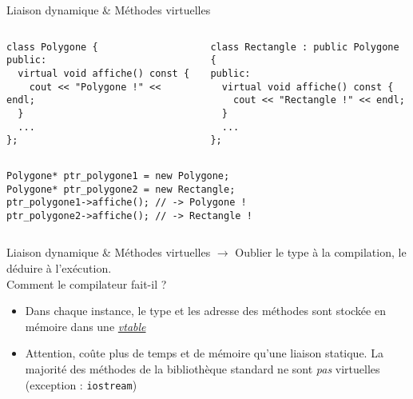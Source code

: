 \documentclass[c]{beamer}
\begin{document}
\begin{frame}[fragile]{Liaison dynamique \& Méthodes virtuelles}
\begin{columns}
\begin{column}{0.5\columnwidth}
\begin{verbatim}
class Polygone {
public:
  virtual void affiche() const {
    cout << "Polygone !" << endl;
  }
  ...
};
\end{verbatim}
\end{column}
\begin{column}{0.5\columnwidth}
\begin{verbatim}
class Rectangle : public Polygone {
public:
  virtual void affiche() const {
    cout << "Rectangle !" << endl;
  }
  ...
};
\end{verbatim}
\end{column}
\end{columns}

\vspace{1em}

\begin{columns}
\begin{column}{0.5\columnwidth}
\begin{verbatim}
Polygone* ptr_polygone1 = new Polygone;
Polygone* ptr_polygone2 = new Rectangle;
ptr_polygone1->affiche(); // -> Polygone !
ptr_polygone2->affiche(); // -> Rectangle !
\end{verbatim}
\end{column}
\end{columns}
\begin{center}
\end{center}
\end{frame}


\begin{frame}[fragile]{Liaison dynamique \& Méthodes virtuelles}
$\rightarrow$ Oublier le type à la compilation, le déduire à l'exécution.\\
Comment le compilateur fait-il ?
\begin{itemize}
  \item Dans chaque instance, le type et les adresse des méthodes sont stockée en mémoire dans une \href{https://en.wikipedia.org/wiki/Virtual_method_table}{\emph{vtable}}
  \item Attention, coûte plus de temps et de mémoire qu'une liaison statique. {\footnotesize La majorité des méthodes de la bibliothèque standard ne sont \emph{pas} virtuelles (exception : \texttt{iostream})}
\end{itemize}
\end{frame}
\end{document}
